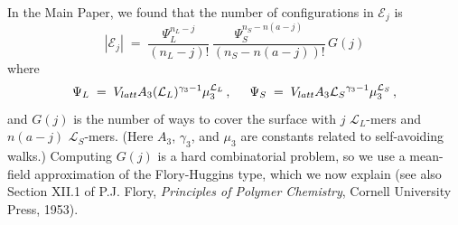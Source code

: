 \documentclass[journal=mamobx,manuscript=article]{achemso}
\newcommand{\leng}{\mathcal{L}}
\begin{document}
In the Main Paper, we found that the number of configurations in $\mathcal{E}_j$ is
\begin{equation}
    |\mathcal{E}_j|  
      \; = \; \frac{ \Psi_L^{n_L-j} }{(n_L-j)!} \,
          \frac{ \Psi_S^{n_S-n(a-j)} }{(n_S-n(a-j))!} \,  G(j)
        \label{eq.Yjsupp}
\end{equation}
where 
\begin{equation}
    \label{eq.psidefsupp}   
   \Psi_L\;=\;V_{latt} A_3 (\leng_L)^{\gamma_3-1} \mu_{3}^{\leng_L} \,,  
    \hspace{5mm} %
     \Psi_S \;=\; V_{latt}A_3{\leng_S}^{\gamma_3-1}\mu_3^{\leng_S} \,,
\end{equation}
and $G(j)$ is the number of ways to cover the surface
with $j$ $\leng_L$-mers and $n(a-j)$ $\leng_S$-mers.
(Here $A_3$, $\gamma_3$, and $\mu_3$ are constants 
related to self-avoiding walks.)  
Computing $G(j)$ is a hard combinatorial problem, so we use a mean-field approximation of the Flory-Huggins type, which we now explain 
(see also Section XII.1 of P.J. Flory, \textit{Principles of Polymer Chemistry}, Cornell University Press, 1953).
\end{document}
